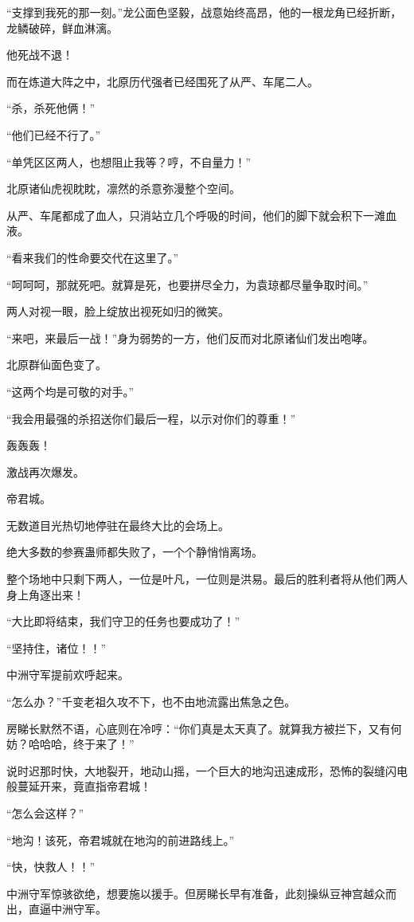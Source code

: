 \begin{this_body}
“支撑到我死的那一刻。”龙公面色坚毅，战意始终高昂，他的一根龙角已经折断，龙鳞破碎，鲜血淋漓。

他死战不退！

而在炼道大阵之中，北原历代强者已经围死了从严、车尾二人。

“杀，杀死他俩！”

“他们已经不行了。”

“单凭区区两人，也想阻止我等？哼，不自量力！”

北原诸仙虎视眈眈，凛然的杀意弥漫整个空间。

从严、车尾都成了血人，只消站立几个呼吸的时间，他们的脚下就会积下一滩血液。

“看来我们的性命要交代在这里了。”

“呵呵呵，那就死吧。就算是死，也要拼尽全力，为袁琼都尽量争取时间。”

两人对视一眼，脸上绽放出视死如归的微笑。

“来吧，来最后一战！”身为弱势的一方，他们反而对北原诸仙们发出咆哮。

北原群仙面色变了。

“这两个均是可敬的对手。”

“我会用最强的杀招送你们最后一程，以示对你们的尊重！”

轰轰轰！

激战再次爆发。

帝君城。

无数道目光热切地停驻在最终大比的会场上。

绝大多数的参赛蛊师都失败了，一个个静悄悄离场。

整个场地中只剩下两人，一位是叶凡，一位则是洪易。最后的胜利者将从他们两人身上角逐出来！

“大比即将结束，我们守卫的任务也要成功了！”

“坚持住，诸位！！”

中洲守军提前欢呼起来。

“怎么办？”千变老祖久攻不下，也不由地流露出焦急之色。

房睇长默然不语，心底则在冷哼：“你们真是太天真了。就算我方被拦下，又有何妨？哈哈哈，终于来了！”

说时迟那时快，大地裂开，地动山摇，一个巨大的地沟迅速成形，恐怖的裂缝闪电般蔓延开来，竟直指帝君城！

“怎么会这样？”

“地沟！该死，帝君城就在地沟的前进路线上。”

“快，快救人！！”

中洲守军惊骇欲绝，想要施以援手。但房睇长早有准备，此刻操纵豆神宫越众而出，直逼中洲守军。


\end{this_body}
